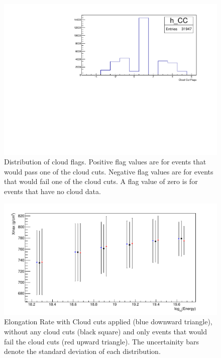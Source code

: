 \begin{figure}[!hp]
\centering
\includegraphics[width=\textwidth]{chapters/graphs/CloudFlags/hist_cloudFlags.pdf}
\caption{Distribution of cloud flags. Positive flag values are for events that would pass one of the cloud cuts. Negative flag values are for events that would fail one of the cloud cuts. A flag value of zero is for events that have no cloud data.}\label{fig:cloudFlag_dist}
\end{figure}

\begin{figure}[!hp]
\centering
\includegraphics[width=\textwidth]{chapters/graphs/CloudFlags/ElongationRate.pdf}
\caption{Elongation Rate with Cloud cuts applied (blue downward triangle), without any cloud cuts (black square) and only events that would fail the cloud cuts (red upward triangle). The uncertainity bars denote the standard deviation of each distribution.} \label{fig:ElongRate_hist}
\end{figure}

